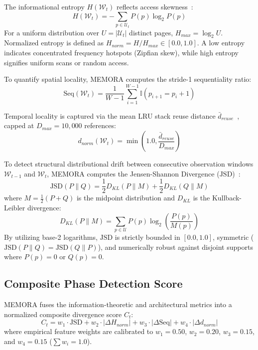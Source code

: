 \documentclass[conference]{IEEEtran}
\begin{document}
The informational entropy $H(\mathcal{W}_t)$ reflects access skewness~\cite{shannon1948mathematical}:
\begin{equation}
H(\mathcal{W}_t) = - \sum_{p \in \mathcal{U}_t} P(p) \log_2 P(p)
\end{equation}
For a uniform distribution over $U = |\mathcal{U}_t|$ distinct pages, $H_{max} = \log_2 U$. Normalized entropy is defined as $H_{norm} = H / H_{max} \in [0.0, 1.0]$. A low entropy indicates concentrated frequency hotspots (Zipfian skew), while high entropy signifies uniform scans or random access.

To quantify spatial locality, MEMORA computes the stride-1 sequentiality ratio:
\begin{equation}
\text{Seq}(\mathcal{W}_t) = \frac{1}{W-1} \sum_{i=1}^{W-1} \mathbb{I}(p_{i+1} = p_i + 1)
\end{equation}

Temporal locality is captured via the mean LRU stack reuse distance $\bar{d}_{reuse}$~\cite{mattson1970evaluation}, capped at $D_{max} = 10{,}000$ references:
\begin{equation}
d_{norm}(\mathcal{W}_t) = \min\left(1.0, \frac{\bar{d}_{reuse}}{D_{max}}\right)
\end{equation}

To detect structural distributional drift between consecutive observation windows $\mathcal{W}_{t-1}$ and $\mathcal{W}_t$, MEMORA computes the Jensen-Shannon Divergence ($\text{JSD}$)~\cite{lin1991divergence}:
\begin{equation}
\text{JSD}(P \parallel Q) = \frac{1}{2} D_{KL}(P \parallel M) + \frac{1}{2} D_{KL}(Q \parallel M)
\end{equation}
where $M = \frac{1}{2}(P + Q)$ is the midpoint distribution and $D_{KL}$ is the Kullback-Leibler divergence:
\begin{equation}
D_{KL}(P \parallel M) = \sum_{p \in \mathcal{U}} P(p) \log_2 \left(\frac{P(p)}{M(p)}\right)
\end{equation}
By utilizing base-2 logarithms, $\text{JSD}$ is strictly bounded in $[0.0, 1.0]$, symmetric ($\text{JSD}(P \parallel Q) = \text{JSD}(Q \parallel P)$), and numerically robust against disjoint supports where $P(p)=0$ or $Q(p)=0$.

\subsection{Composite Phase Detection Score}
MEMORA fuses the information-theoretic and architectural metrics into a normalized composite divergence score $C_t$:
\begin{equation}
C_t = w_1 \cdot \text{JSD} + w_2 \cdot |\Delta H_{norm}| + w_3 \cdot |\Delta \text{Seq}| + w_4 \cdot |\Delta d_{norm}|
\end{equation}
where empirical feature weights are calibrated to $w_1 = 0.50$, $w_2 = 0.20$, $w_3 = 0.15$, and $w_4 = 0.15$ ($\sum w_i = 1.0$). 
\end{document}
